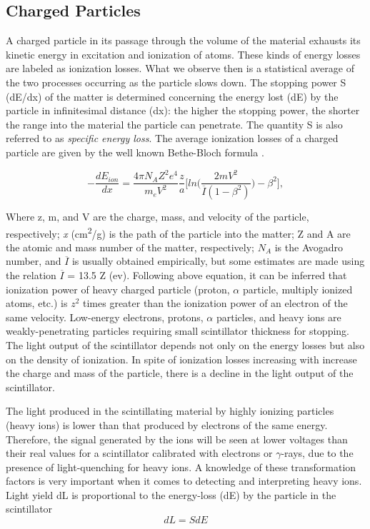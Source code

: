 \subsection{Charged Particles}
A charged particle in its passage through the volume of the material exhausts its kinetic energy in excitation and ionization of atoms. These kinds of energy losses are labeled as ionization losses. What we observe then is a statistical average of the two processes occurring as the particle slows down. The stopping power S (dE/dx) of the matter is determined concerning the energy lost (dE) by the particle in infinitesimal distance (dx): the higher the stopping power, the shorter the range into the material the particle can penetrate. The quantity S is also referred to as \textit{specific energy loss}. The average ionization losses of a charged particle are given by the well known Bethe-Bloch formula \citep{bethebloch}.

\begin{equation}
-\frac{dE_{ion}}{dx}=\frac{4\pi N_{A} Z^{2} e^{4}}{m_{e} V^{2}} \frac{z}{a} \Bigg[ ln\Bigg(   \frac{2mV^{2}}{\overline{I} (1-\beta^{2})}    \Bigg) -\beta^{2}\Bigg],
\end{equation}


Where z, m, and V are the charge, mass, and velocity of the particle, respectively; \textit{x} (cm\textsuperscript{2}/g) is the path of the particle into the matter; Z and A are the atomic and mass number of the matter, respectively; $N_{A}$ is the Avogadro number, and $\overline{I}$ is usually obtained empirically, but some estimates are made using the relation $\overline{I}$ = 13.5 Z (ev).
\newline
Following above equation, it can be inferred that ionization power of heavy charged particle (proton, $\alpha$ particle, multiply ionized atoms, etc.) is $z^{2}$ times greater than the ionization power of an electron of the same velocity. Low-energy electrons, protons, $\alpha$ particles, and heavy ions are weakly-penetrating particles requiring small scintillator thickness for stopping. The light output of the scintillator depends not only on the energy losses but also on the density of ionization. In spite of ionization losses increasing with increase the charge  and mass of the particle, there is a decline in the light output of the scintillator.

The light produced in the scintillating material by highly ionizing particles (heavy ions) is lower than that produced by electrons of the same energy. Therefore, the signal generated by the ions will be seen at lower voltages than their real values for a scintillator calibrated with electrons or $\gamma$-rays, due to the presence of light-quenching for heavy ions. A knowledge of these transformation factors is very important when it comes to detecting and interpreting heavy ions. 
Light yield dL is proportional to the energy-loss (dE) by the particle in the scintillator
\begin{equation}
dL = SdE
\end{equation}

